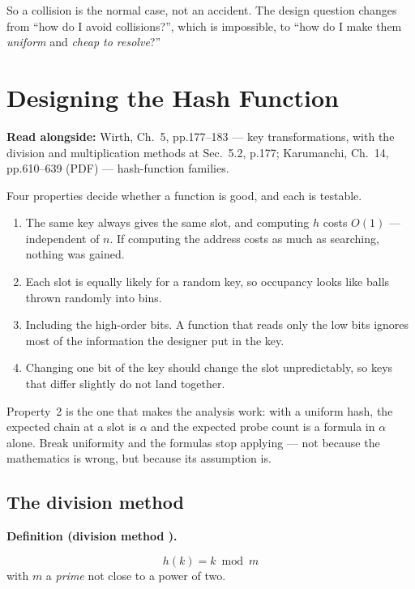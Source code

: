 \documentclass[11pt]{article}
\newenvironment{definitionbox}[1]{%
  \par\noindent\textbf{Definition (#1).}\ \itshape
}{\par\vspace{0.3em}}
\begin{document}
So a collision is the normal case, not an accident. The design question changes from ``how do I avoid collisions?'', which is impossible, to ``how do I make them \emph{uniform} and \emph{cheap to resolve}?''

\section{Designing the Hash Function}

\textbf{Read alongside:} Wirth, Ch.~5, pp.177--183 --- key transformations, with the division and multiplication methods at Sec.~5.2, p.177; Karumanchi, Ch.~14, pp.610--639 (PDF) --- hash-function families.

Four properties decide whether a function is good, and each is testable.

\begin{enumerate}
  \item {} The same key always gives the same slot, and computing $h$ costs $O(1)$ --- independent of $n$. If computing the address costs as much as searching, nothing was gained.
  \item {} Each slot is equally likely for a random key, so occupancy looks like balls thrown randomly into bins.
  \item {} Including the high-order bits. A function that reads only the low bits ignores most of the information the designer put in the key.
  \item {} Changing one bit of the key should change the slot unpredictably, so keys that differ slightly do not land together.
\end{enumerate}

Property~2 is the one that makes the analysis work: with a uniform hash, the expected chain at a slot is $\alpha$ and the expected probe count is a formula in $\alpha$ alone. Break uniformity and the formulas stop applying --- not because the mathematics is wrong, but because its assumption is.

\subsection{The division method}

\begin{definitionbox}{division method \cite{Wirth2004_algorithms_data_structures,Sedgewick2011_algorithms}}
\[ h(k) = k \bmod m \]
with $m$ a \emph{prime} not close to a power of two.
\end{definitionbox}
\end{document}
